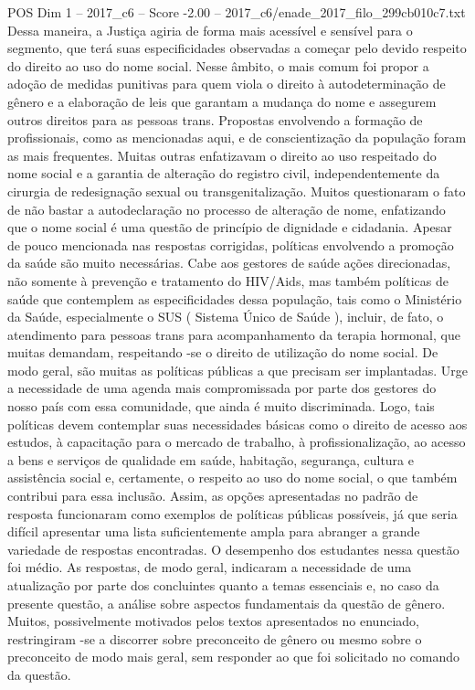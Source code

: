 \begin{textsample}{POS Dim 1 – 2017\_c6 – Score -2.00 – 2017\_c6/enade\_2017\_filo\_299cb010c7.txt}
Dessa maneira, a Justiça agiria de forma mais acessível e sensível para o segmento, que terá suas especificidades observadas a começar pelo devido respeito do direito ao uso do nome social.
Nesse âmbito, o mais comum foi propor a adoção de medidas punitivas para quem viola o direito à autodeterminação de gênero e a elaboração de leis que garantam a mudança do nome e assegurem outros direitos para as pessoas trans.
Propostas envolvendo a formação de profissionais, como as mencionadas aqui, e de conscientização da população foram as mais frequentes.
Muitas outras enfatizavam o direito ao uso respeitado do nome social e a garantia de alteração do registro civil, independentemente da cirurgia de redesignação sexual ou transgenitalização.
Muitos questionaram o fato de não bastar a autodeclaração no processo de alteração de nome, enfatizando que o nome social é uma questão de princípio de dignidade e cidadania.
Apesar de pouco mencionada nas respostas corrigidas, políticas envolvendo a promoção da saúde são muito necessárias.
Cabe aos gestores de saúde ações direcionadas, não somente à prevenção e tratamento do HIV/Aids, mas também políticas de saúde que contemplem as especificidades dessa população, tais como o Ministério da Saúde, especialmente o SUS ( Sistema Único de Saúde ), incluir, de fato, o atendimento para pessoas trans para acompanhamento da terapia hormonal, que muitas demandam, respeitando -se o direito de utilização do nome social.
De modo geral, são muitas as políticas públicas a que precisam ser implantadas.
Urge a necessidade de uma agenda mais compromissada por parte dos gestores do nosso país com essa comunidade, que ainda é muito discriminada.
Logo, tais políticas devem contemplar suas necessidades básicas como o direito de acesso aos estudos, à capacitação para o mercado de trabalho, à profissionalização, ao acesso a bens e serviços de qualidade em saúde, habitação, segurança, cultura e assistência social e, certamente, o respeito ao uso do nome social, o que também contribui para essa inclusão.
Assim, as opções apresentadas no padrão de resposta funcionaram como exemplos de políticas públicas possíveis, já que seria difícil apresentar uma lista suficientemente ampla para abranger a grande variedade de respostas encontradas.
O desempenho dos estudantes nessa questão foi médio.
As respostas, de modo geral, indicaram a necessidade de uma atualização por parte dos concluintes quanto a temas essenciais e, no caso da presente questão, a análise sobre aspectos fundamentais da questão de gênero.
Muitos, possivelmente motivados pelos textos apresentados no enunciado, restringiram -se a discorrer sobre preconceito de gênero ou mesmo sobre o preconceito de modo mais geral, sem responder ao que foi solicitado no comando da questão.

\end{textsample}
